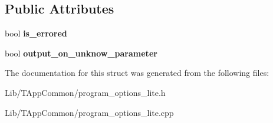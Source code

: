 \subsection*{Public Attributes}
\begin{DoxyCompactItemize}
\item 
\mbox{\label{structdf_1_1program__options__lite_1_1_error_reporter_ad25ff3165311cba2f3c12d25843a7cc2}} 
bool {\bfseries is\+\_\+errored}
\item 
\mbox{\label{structdf_1_1program__options__lite_1_1_error_reporter_af2503a95e98ec411fadfb1f6d1ca1086}} 
bool {\bfseries output\+\_\+on\+\_\+unknow\+\_\+parameter}
\end{DoxyCompactItemize}


The documentation for this struct was generated from the following files\+:\begin{DoxyCompactItemize}
\item 
Lib/\+T\+App\+Common/program\+\_\+options\+\_\+lite.\+h\item 
Lib/\+T\+App\+Common/program\+\_\+options\+\_\+lite.\+cpp\end{DoxyCompactItemize}
